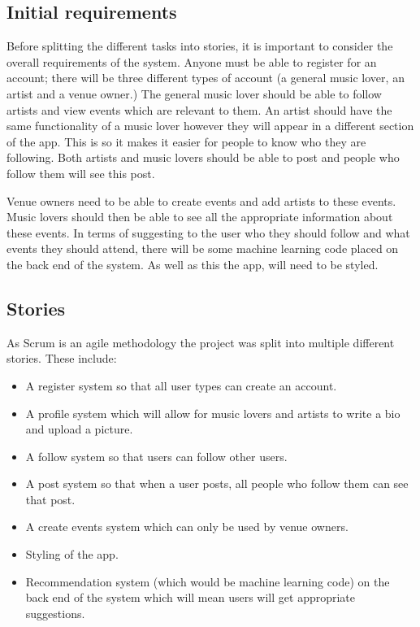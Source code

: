 \subsection{Initial requirements}
Before splitting the different tasks into stories, it is important to consider the overall requirements of the system. Anyone must be able to register for an account; there will be three different types of account (a general music lover, an artist and a venue owner.) The general music lover should be able to follow artists and view events which are relevant to them. An artist should have the same functionality of a music lover however they will appear in a different section of the app. This is so it makes it easier for people to know who they are following. Both artists and music lovers should be able to post and people who follow them will see this post.

Venue owners need to be able to create events and add artists to these events. Music lovers should then be able to see all the appropriate information about these events. In terms of suggesting to the user who they should follow and what events they should attend, there will be some machine learning code placed on the back end of the system. As well as this the app, will need to be styled.

\subsection{Stories}
As Scrum is an agile methodology the project was split into multiple different stories. These include:
\begin{itemize}
	\item A register system so that all user types can create an account.
	\item A profile system which will allow for music lovers and artists to write a bio and upload a picture.
	\item A follow system so that users can follow other users.
	\item A post system so that when a user posts, all people who follow them can see that post.
	\item A create events system which can only be used by venue owners.
	\item Styling of the app.
	\item Recommendation system (which would be machine learning code) on the back end of the system which will mean users will get appropriate suggestions.
\end{itemize}

